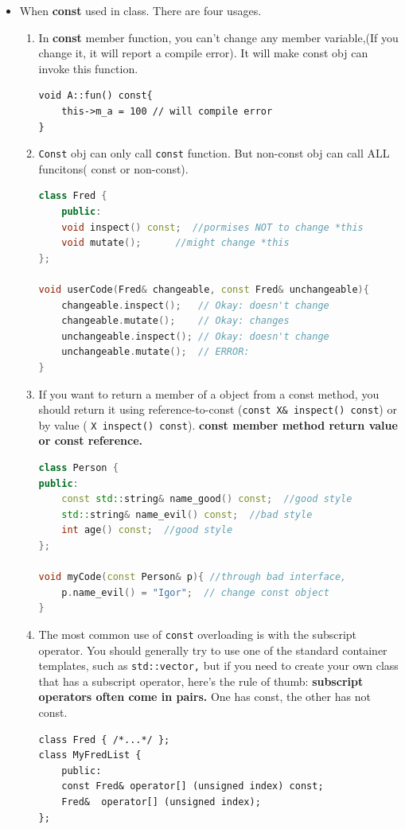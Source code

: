 \documentclass[a4paper,11pt,twoside]{book}
\begin{document}
\begin{itemize}
	
	\item When \textbf{const} used in class. There are four usages.
	\begin{enumerate}
		\item In \textbf{const} member function, you can't change any member variable,(If you change it, it will report a compile error). It will make const obj can invoke this function.
\begin{lstlisting}[numbers=none]
void A::fun() const{
	this->m_a = 100 // will compile error
}
\end{lstlisting}
		
		\item \texttt{Const} obj can only call \texttt{const} function. But non-const obj can call ALL funcitons( const or non-const).
\begin{lstlisting}[frame=single, language=c++, mathescape=true]
class Fred {
	public:
	void inspect() const;  //pormises NOT to change *this
	void mutate();      //might change *this
};

void userCode(Fred& changeable, const Fred& unchangeable){
	changeable.inspect();   // Okay: doesn't change
	changeable.mutate();    // Okay: changes
	unchangeable.inspect(); // Okay: doesn't change
	unchangeable.mutate();  // ERROR:
}
\end{lstlisting}

		\item If you want to return a member of a object from a const method, you should return it using reference-to-const (\texttt{const X\& inspect() const}) or by value ( \texttt{X inspect() const}). \textbf{const member method return value or const reference.}
\begin{lstlisting}[frame=single, language=c++]
class Person {
public:
	const std::string& name_good() const;  //good style
	std::string& name_evil() const;  //bad style
	int age() const;  //good style
};

void myCode(const Person& p){ //through bad interface,
	p.name_evil() = "Igor";  // change const object
}
\end{lstlisting}
		
		\item The most common use of \texttt{const} overloading is with the subscript operator. You should generally try to use one of the standard container templates, such as \texttt{std::vector,} but if you need to create your own class that has a subscript operator, here's the rule of thumb:\textbf{ subscript operators often come in pairs.} One has const, the other has not const. 
\begin{lstlisting}[numbers=none]
class Fred { /*...*/ };
class MyFredList {
	public:
	const Fred& operator[] (unsigned index) const;
	Fred&  operator[] (unsigned index);
};
\end{lstlisting}
		

\end{enumerate}
\end{itemize}
\end{document}
